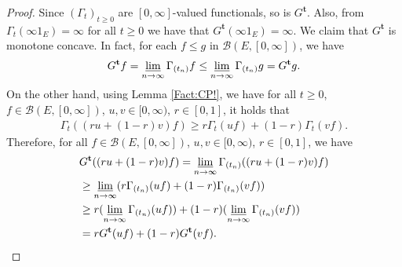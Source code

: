 \documentclass[12pt,a4paper]{amsart}
\numberwithin{equation}{section}
\theoremstyle{plain}
\theoremstyle{definition}
\theoremstyle{remark}
\begin{document}
\begin{proof}
	Since $(\Gamma_t)_{t\geq 0}$ are $[0,\infty]$-valued functionals, so is $G^{\mathbf t}$.
	Also, from $\Gamma_t(\infty  1_E) = \infty$ for all $t\geq 0$ we have that $G^{\mathbf t}(\infty 1_E) = \infty$.
	We claim that $G^\mathbf t$ is monotone concave.
	In fact, for each $f \leq g$ in $\mathcal B(E,[0,\infty])$, we have
	\begin{equation}
	G^{\mathbf t} f
	= \varliminf_{n\to \infty} \Gamma_{(t_n)} f
	\leq \varliminf_{n\to \infty} \Gamma_{(t_n)} g
	= G^{\mathbf t} g.
	\end{equation}
	On the other hand, using Lemma \ref{Fact:CP!}, we have for all $t\geq 0$, $f\in \mathcal B(E,[0,\infty])$, $u,v \in [0,\infty)$, $r\in [0,1]$, it holds that
	\begin{align}
	\Gamma_t((ru+(1-r) v)f)
	\geq r \Gamma_t (uf) + (1-r) \Gamma_t (vf).
	\end{align}
	Therefore, for all $f\in \mathcal B(E,[0,\infty])$, $u,v \in [0,\infty)$, $r \in [0,1]$, we have
	\begin{align}
	& G^{\mathbf t}((ru + (1-r)v)f)
	= \varliminf_{n \to \infty} \Gamma_{(t_n)}((ru + (1-r)v)f)
	\\&\geq \varliminf_{n\to \infty} (r\Gamma_{(t_n)} (uf) + (1-r)\Gamma_{(t_n)}(vf))
	\\&\geq r (\varliminf_{n\to \infty} \Gamma_{(t_n)} (uf)) + (1-r) (\varliminf_{n\to \infty} \Gamma_{(t_n)}(vf) )
	\\&= r G^{\mathbf t} (uf) + (1-r) G^{\mathbf t}(vf).
	\end{align}
	

\end{proof}
\end{document}
